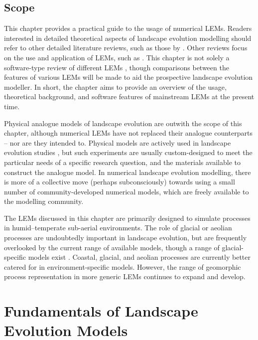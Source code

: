 \subsection[Scope]{Scope}
This chapter provides a practical guide to the usage of numerical LEMs. Readers interested in detailed theoretical aspects of landscape evolution modelling should refer to other detailed literature reviews, such as those by \citet{Pazzaglia2003,martin2004numerical,Willgoose2005,Tucker2010}. Other reviews focus on the use and application of LEMs, such as \citet{willgoose2011,van2011modelling,temme2013quantitative}. This chapter is not solely a software-type review of different LEMs \citep[e.g.][]{Coulthard2001}, though comparisons between the features of various LEMs will be made to aid the prospective landscape evolution modeller. In short, the chapter aims to provide an overview of the usage, theoretical background, and software features of mainstream LEMs at the present time.

Physical analogue models of landscape evolution are outwith the scope of this chapter, although numerical LEMs have not replaced their analogue counterparts – nor are they intended to. Physical models are actively used in landscape evolution studies \citep{hancock2002testing,Bonnet2006,Bonnet2009,Sweeney2015}, but such experiments are usually custom-designed to meet the particular needs of a specific research question, and the materials available to construct the analogue model. In numerical landscape evolution modelling, there is more of a collective move (perhaps subconsciously) towards using a small number of community-developed numerical models, which are freely available to the modelling community.

The LEMs discussed in this chapter are primarily designed to simulate processes in humid--temperate sub-aerial environments. The role of glacial or aeolian processes are undoubtedly important in landscape evolution, but are frequently overlooked by the current range of available models, though a range of glacial-specific models exist \citep[e.g.][]{Braun1999,Tomkin2007,Herman2008,Egholm2011,Egholm2012}. Coastal, glacial, and aeolian processes are currently better catered for in environment-specific models. However, the range of geomorphic process representation in more generic LEMs continues to expand and develop.

\section{Fundamentals of Landscape Evolution Models}

